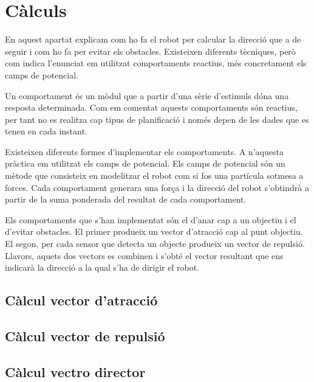 \section{Càlculs}
En aquest apartat explicam com ho fa el robot per calcular la direcció que a de
seguir i com ho fa per evitar els obstacles. Existeixen diferents tècniques,
però com indica l'enunciat em utilitzat comportaments reactius, més concretament
els camps de potencial. 

Un comportament és un mòdul que a partir d'una sèrie d'estimuls dóna una
resposta determinada. Com em comentat aquests comportaments són reactius, per
tant no es realitza cap tipus de planificació i només depen de les dades que es
tenen en cada instant. 

Existeixen diferents formes d'implementar els comportaments. A n'aquesta
pràctica em utilitzat els camps de potencial. Els camps de potencial són un
mètode que consisteix en modelitzar el robot com si fos una partícula sotmesa a
forces. Cada comportament generara una força i la direcció del robot s'obtindrà
a partir de la suma ponderada del resultat de cada comportament.

Els comportaments que s'han implementat són el d'anar cap a un objectiu i el
d'evitar obstacles. El primer produeix un vector d'atracció cap al punt
objectiu. El segon, per cada sensor que detecta un objecte produeix un vector
de repulsió. Llavors, aquets dos vectors es combinen i s'obté el vector
resultant que ens indicarà la direcció a la qual s'ha de dirigir el robot. 

\subsection{Càlcul vector d'atracció}

\subsection{Càlcul vector de repulsió}

\subsection{Càlcul vectro director} 




